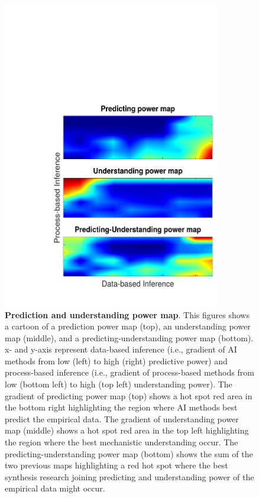 \documentclass[authoryear,1p,12pt]{elsarticle}
\begin{document}
\begin{figure}[htp]
  \centering
  \includegraphics[height=0.018\maxdimen, width=0.85\textwidth]{Figure3-2}
  \caption{
    \textbf{Prediction and understanding power
         map}. This figures shows a cartoon of a prediction power map
       (top), an understanding power map (middle), and a
       predicting-understanding power map (bottom). x- and y-axis
       represent data-based inference (i.e., gradient of AI methods
       from low (left) to high (right) predictive power) and
       process-based inference (i.e., gradient of process-based
       methods from low (bottom left) to high (top left) understanding
       power). The gradient of predicting power map (top) shows a hot
       spot red area in the bottom right highlighting the region where
       AI methods best predict the empirical data. The gradient of
       understanding power map (middle) shows a hot spot red area in
       the top left highlighting the region where the best mechanistic
       understanding occur. The predicting-understanding power map
       (bottom) shows the sum of the two previous maps highlighting a
       red hot spot where the best synthesis research joining
       predicting and understanding power of the empirical data might
       occur.
    }
  \label{fig:3}
\end{figure}
\end{document}
